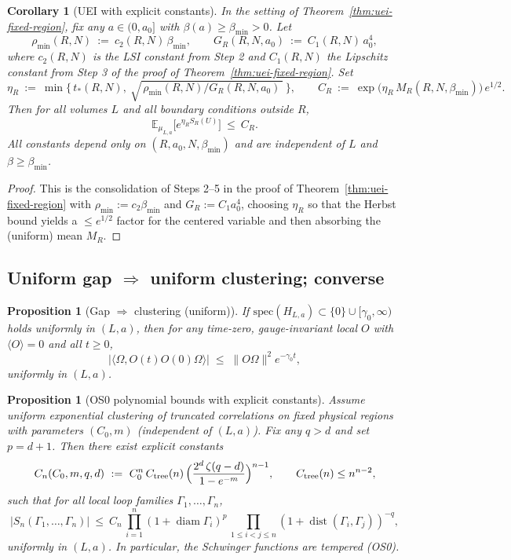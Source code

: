 \documentclass[11pt]{amsart}
\theoremstyle{plain}
\newtheorem{proposition}[theorem]{Proposition}
\newtheorem{corollary}[theorem]{Corollary}
\theoremstyle{definition}
\theoremstyle{remark}
\begin{document}
\begin{corollary}[UEI with explicit constants]\label{cor:uei-explicit-constants}
In the setting of Theorem~\ref{thm:uei-fixed-region}, fix any $a\in(0,a_0]$ with $\beta(a)\ge \beta_{\min}>0$. Let
\[
  \rho_{\min}(R,N)\ :=\ c_2(R,N)\,\beta_{\min},\qquad
  G_R(R,N,a_0)\ :=\ C_1(R,N)\,a_0^4,
\]
where $c_2(R,N)$ is the LSI constant from Step 2 and $C_1(R,N)$ the Lipschitz constant from Step 3 of the proof of Theorem~\ref{thm:uei-fixed-region}. Set
\[
  \eta_R\ :=\ \min\Big\{\,t_*(R,N),\ \sqrt{\,\rho_{\min}(R,N)\big/ G_R(R,N,a_0)\,}\ \Big\},\qquad
  C_R\ :=\ \exp\big(\eta_R\,M_R(R,N,\beta_{\min})\big)\,e^{1/2}.
\]
Then for all volumes $L$ and all boundary conditions outside $R$,
\[
  \mathbb{E}_{\mu_{L,a}}\big[e^{\eta_R S_R(U)}\big]\ \le\ C_R.
\]
All constants depend only on $(R,a_0,N,\beta_{\min})$ and are independent of $L$ and $\beta\ge \beta_{\min}$.
\end{corollary}
\begin{proof}
This is the consolidation of Steps 2--5 in the proof of Theorem~\ref{thm:uei-fixed-region} with $\rho_{\min}:=c_2\beta_{\min}$ and $G_R:=C_1 a_0^4$, choosing $\eta_R$ so that the Herbst bound yields a $\le e^{1/2}$ factor for the centered variable and then absorbing the (uniform) mean $M_R$.
\end{proof}

\subsection*{Uniform gap $\Rightarrow$ uniform clustering; converse}

\begin{proposition}[Gap $\Rightarrow$ clustering (uniform)]\label{prop:gap-to-cluster}
If $\mathrm{spec}(H_{L,a})\subset\{0\}\cup[\gamma_0,\infty)$ holds uniformly in $(L,a)$, then for any time-zero, gauge-invariant local $O$ with $\langle O\rangle=0$ and all $t\ge 0$,
\[
  |\langle\Omega, O(t)O(0)\Omega\rangle|\;\le\;\|O\Omega\|^2 e^{-\gamma_0 t},
\]
uniformly in $(L,a)$.
\end{proposition}

\begin{proposition}[OS0 polynomial bounds with explicit constants]\label{prop:OS0-poly}
Assume uniform exponential clustering of truncated correlations on fixed physical regions with parameters $(C_0,m)$ (independent of $(L,a)$). Fix any $q>d$ and set $p=d+1$. Then there exist explicit constants
\[
  C_n(C_0,m,q,d)\ :=\ C_0^n\,C_{\mathrm{tree}}(n)\,\Bigl(\frac{2^d\,\zeta(q-d)}{1-e^{-m}}\Bigr)^{n-1},\qquad C_{\mathrm{tree}}(n)\le n^{n-2},
\]
such that for all local loop families $\Gamma_1,\dots,\Gamma_n$,
\[
  |S_n(\Gamma_1,\dots,\Gamma_n)|\ \le\ C_n\,\prod_{i=1}^n (1+\operatorname{diam}\Gamma_i)^p\,\prod_{1\le i<j\le n} (1+\operatorname{dist}(\Gamma_i,\Gamma_j))^{-q},
\]
uniformly in $(L,a)$. In particular, the Schwinger functions are tempered (OS0).
\end{proposition}
\end{document}

